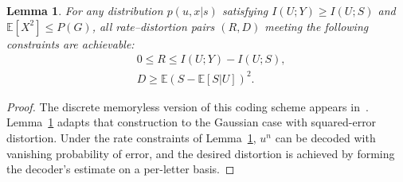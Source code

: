 \documentclass[journal]{IEEEtran}
\def\eE{\mathbb E}
\newtheorem{lemma}{Lemma}
\def\eE{\mathbb E}
\begin{document}
\begin{lemma} \label{lem:achieve}
For any distribution $p(u,x|s)$ satisfying ${I(U;Y) \geq I(U;S)}$ and $\mathbb{E}[X^2] \leq P(G)$, all rate–distortion pairs $(R,D)$ meeting the following constraints are achievable:
\begin{align}
&0 \leq  R \leq I(U;Y) - I(U;S), \label{eq:achieve:rate} \\
&D  \geq \eE \left( S - \eE \left[ S|U \right] \right)^2. \label{eq:achieve:dist}
\end{align}
\end{lemma}

\begin{proof}
The discrete memoryless version of this coding scheme appears in~\cite[Theorem~2]{steinberg2009coding}. Lemma~\ref{lem:achieve} adapts that construction to the Gaussian case with squared-error distortion. Under the rate constraints of Lemma~\ref{lem:achieve}, $u^n$ can be decoded with vanishing probability of error, and the desired distortion is achieved by forming the decoder’s estimate on a per-letter basis.  
\end{proof}
\end{document}
